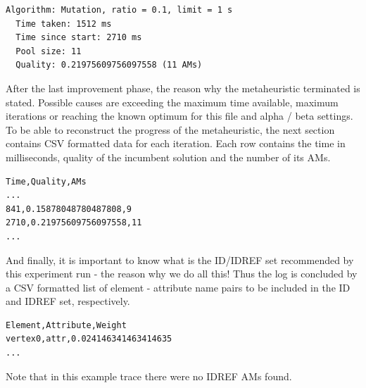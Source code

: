 \documentclass[a4paper,12pt,oneside]{report}
\begin{document}
\begin{footnotesize}
\begin{verbatim}
Algorithm: Mutation, ratio = 0.1, limit = 1 s
  Time taken: 1512 ms
  Time since start: 2710 ms
  Pool size: 11
  Quality: 0.21975609756097558 (11 AMs)
\end{verbatim}
\end{footnotesize}

After the last improvement phase, the reason why the metaheuristic terminated is stated. Possible causes are exceeding the maximum time available, maximum iterations or reaching the known optimum for this file and alpha / beta settings.
\\

To be able to reconstruct the progress of the metaheuristic, the next section contains CSV  formatted data for each iteration. Each row contains the time in milliseconds, quality of the incumbent solution and the number of its AMs.

\begin{footnotesize}
\begin{verbatim}
Time,Quality,AMs
...
841,0.15878048780487808,9
2710,0.21975609756097558,11
...
\end{verbatim}
\end{footnotesize}

And finally, it is important to know what is the ID/IDREF set recommended by this experiment run - the reason why we do all this! Thus the log is concluded by a CSV formatted list of element - attribute name pairs to be included in the ID and IDREF set, respectively.

\begin{footnotesize}
\begin{verbatim}
Element,Attribute,Weight
vertex0,attr,0.024146341463414635
...
\end{verbatim}
\end{footnotesize}

Note that in this example trace there were no IDREF AMs found.
\end{document}
